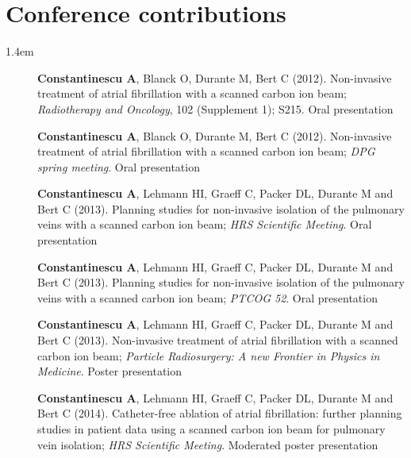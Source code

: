 \section*{Conference contributions}
\begin{setlength}{\leftmargini}{1.4em}
  \begin{description}
    \item[] \textbf{Constantinescu A}, Blanck O, Durante M, Bert C (2012). Non-invasive treatment of atrial fibrillation with a scanned carbon ion beam; \textit{Radiotherapy and Oncology}, 102 (Supplement 1); S215. Oral presentation
    \item[] \textbf{Constantinescu A}, Blanck O, Durante M, Bert C (2012). Non-invasive treatment of atrial fibrillation with a scanned carbon ion beam; \textit{DPG spring meeting}. Oral presentation
    \item[] \textbf{Constantinescu A}, Lehmann HI, Graeff C, Packer DL, Durante M and Bert C (2013). Planning studies for non-invasive isolation of the pulmonary veins with a scanned carbon ion beam; \textit{HRS Scientific Meeting}. Oral presentation
    \item[] \textbf{Constantinescu A}, Lehmann HI, Graeff C, Packer DL, Durante M and Bert C (2013). Planning studies for non-invasive isolation of the pulmonary veins with a scanned carbon ion beam; \textit{PTCOG 52}. Oral presentation
    \item[] \textbf{Constantinescu A}, Lehmann HI, Graeff C, Packer DL, Durante M and Bert C (2013). Non-invasive treatment of atrial fibrillation with a scanned carbon ion beam; \textit{Particle Radiosurgery: A new Frontier in Physics in Medicine}. Poster presentation
    \item[] \textbf{Constantinescu A}, Lehmann HI, Graeff C, Packer DL, Durante M and Bert C (2014). Catheter-free ablation of atrial fibrillation: further planning studies in patient data using a scanned carbon ion beam for pulmonary vein isolation; \textit{HRS Scientific Meeting}. Moderated poster presentation
      \end{description}
\end{setlength}




% 